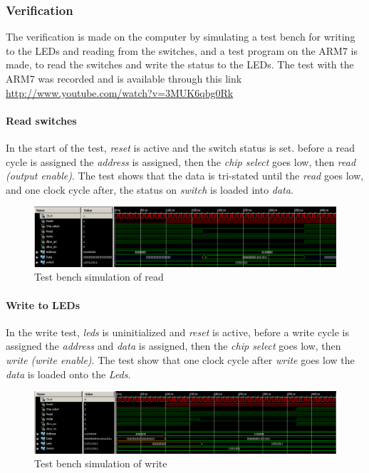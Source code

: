 \subsubsection{Verification}
The verification is made on the computer by simulating a test bench for writing to the LEDs and reading from the switches, and a test program on the ARM7 is made, to read the switches and write the status to the LEDs. The test with the ARM7 was recorded and is available through this link \url{http://www.youtube.com/watch?v=3MUK6qbg0Rk}
\paragraph{Read switches}
In the start of the test, \textit{reset} is active and the switch status is set. before a read cycle is assigned the \textit{address} is assigned, then the \textit{chip select} goes low, then \textit{read (output enable)}. The test shows that the data is tri-stated until the \textit{read} goes low, and one clock cycle after, the status on \textit{switch} is loaded into \textit{data}.
\begin{figure}[H]
	\begin{centering}
		\includegraphics[width=1.0\textwidth]{images/tb_wb_read.png}
		\caption{Test bench simulation of read}
	\end{centering}
\end{figure}
\paragraph{Write to LEDs}
In the write test, \textit{leds} is uninitialized and \textit{reset} is active, before a write cycle is assigned the \textit{address} and \textit{data} is assigned, then the \textit{chip select} goes low, then \textit{write (write enable)}. The test show that one clock cycle after \textit{write} goes low the \textit{data} is loaded onto the \textit{Leds}.
\begin{figure}[H]
	\begin{centering}
		\includegraphics[width=1.0\textwidth]{images/tb_wb_write.png}
		\caption{Test bench simulation of write}
	\end{centering}
\end{figure}
